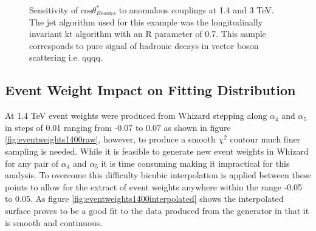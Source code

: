 \begin{figure}
\caption[Sensitivity of $\text{cos}\theta^{8}_{Bosons}$ to the anomalous gauge couplings $\alpha_{4}$ and $\alpha_{5}$ at 1.4 and 3 TeV.]{Sensitivity of $\text{cos}\theta^{*}_{Bosons}$ to anomalous couplings at 1.4 and 3 TeV. The jet algorithm used for this example was the longitudinally invariant kt algorithm with an R parameter of 0.7. This sample corresponds to pure signal of hadronic decays in vector boson scattering i.e. \nu{\nu}qqqq.}
\label{fig:costhetastarbosons}
\end{figure}

\subsection{Event Weight Impact on Fitting Distribution}
At 1.4 TeV event weights were produced from Whizard stepping along $\alpha_{4}$ and $\alpha_{5}$ in steps of 0.01 ranging from -0.07 to 0.07 as shown in figure \ref{fig:eventweights1400raw}, however, to produce a smooth $\chi^{2}$ contour much finer sampling is needed.  While it is feasible to generate new event weights in Whizard for any pair of $\alpha_{4}$ and $\alpha_{5}$ it is time consuming making it impractical for this analysis.  To overcome this difficulty bicubic interpolation is applied between these points to allow for the extract of event weights anywhere within the range -0.05 to 0.05.  As figure \ref{fig:eventweights1400interpolated} shows the interpolated surface proves to be a good fit to the data produced from the generator in that it is smooth and continuous.  

